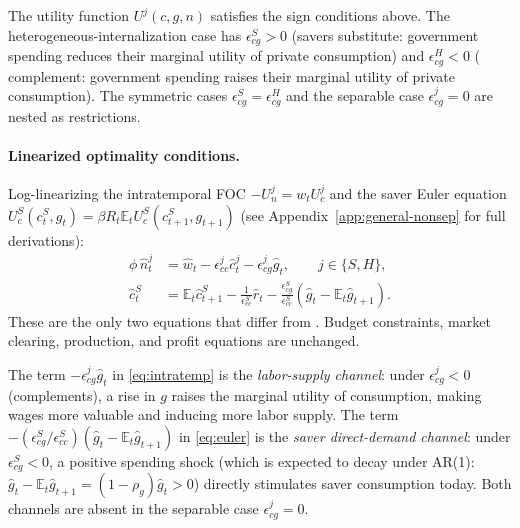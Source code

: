 \begin{assumption}\label{asm:general}
The utility function $U^{j}(c,g,n)$ satisfies the sign conditions above. The
heterogeneous-internalization case has $\epsilon^{S}_{cg}>0$ (savers
substitute: government spending reduces their marginal utility of private
consumption) and $\epsilon^{H}_{cg}<0$ (\HtM{} complement: government spending
raises their marginal utility of private consumption). The symmetric cases
$\epsilon^{S}_{cg}=\epsilon^{H}_{cg}$ and the separable case
$\epsilon^{j}_{cg}=0$ are nested as restrictions.
\end{assumption}

\paragraph{Linearized optimality conditions.}
Log-linearizing the intratemporal FOC $-U^{j}_{n}=w_{t}U^{j}_{c}$ and the saver
Euler equation $U^{S}_{c}(c^{S}_{t},g_{t})=\beta R_{t}\mathbb{E}_{t}
U^{S}_{c}(c^{S}_{t+1},g_{t+1})$ (see Appendix~\ref{app:general-nonsep} for full
derivations):
\begin{align}
  \phi\,\hat n^{j}_{t} &= \hat w_{t} - \epsilon^{j}_{cc}\hat c^{j}_{t}
    - \epsilon^{j}_{cg}\hat g_{t},\qquad j\in\{S,H\}, \label{eq:intratemp}\\
  \hat c^{S}_{t} &= \mathbb{E}_{t}\hat c^{S}_{t+1}
    -\frac{1}{\epsilon^{S}_{cc}}\hat r_{t}
    -\frac{\epsilon^{S}_{cg}}{\epsilon^{S}_{cc}}(\hat g_{t}-\mathbb{E}_{t}\hat g_{t+1}).
    \label{eq:euler}
\end{align}
These are the only two equations that differ from \bilbiie{}. Budget constraints,
market clearing, production, and profit equations are unchanged.

\begin{remark}\label{rem:two-channels}
The term $-\epsilon^{j}_{cg}\hat g_{t}$ in \eqref{eq:intratemp} is the
\emph{labor-supply channel}: under $\epsilon^{j}_{cg}<0$ (complements), a rise
in $g$ raises the marginal utility of consumption, making wages more valuable
and inducing more labor supply. The term
$-(\epsilon^{S}_{cg}/\epsilon^{S}_{cc})(\hat g_{t}-\mathbb{E}_{t}\hat g_{t+1})$
in \eqref{eq:euler} is the \emph{saver direct-demand channel}: under
$\epsilon^{S}_{cg}<0$, a positive spending shock (which is expected to decay
under AR(1): $\hat g_{t}-\mathbb{E}_{t}\hat g_{t+1}=(1-\rho_{g})\hat g_{t}>0$)
directly stimulates saver consumption today. Both channels are absent in the
separable case $\epsilon^{j}_{cg}=0$.
\end{remark}

